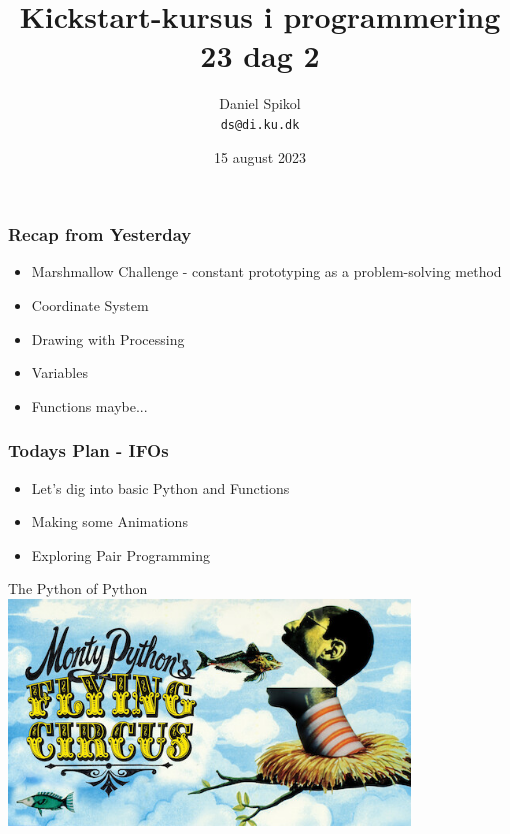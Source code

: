 \documentclass[10pt]{beamer}
\title[Kickstart-kursus] %
  {Kickstart-kursus i programmering 23 dag 2} %
\author{\footnotesize{Daniel Spikol} \\
          \footnotesize{\texttt{ds@di.ku.dk}}}
\institute {DIKU \\ Københavns Universitet}
\date[15. august 2023]{15 august 2023}
\begin{document}
\begin{frame}[plain]
\titlepage
\end{frame}



\begin{frame}
   \frametitle{Recap from Yesterday}
   	\begin{itemize}
	\item Marshmallow Challenge - constant prototyping as a problem-solving method
	\item Coordinate System 
	\item Drawing with Processing
	\item Variables
	\item Functions maybe...
	\end{itemize}
\end{frame}


\begin{frame}
\frametitle{Todays Plan - IFOs}
\begin{itemize}
\item Let's dig into basic Python and Functions
\item Making some Animations
\item Exploring Pair Programming
\end{itemize}
\end{frame}



\begin{frame}{The Python of Python}
    	 \includegraphics[height=6cm]{images/MPFC-logo}
\end{frame}

\end{document}
